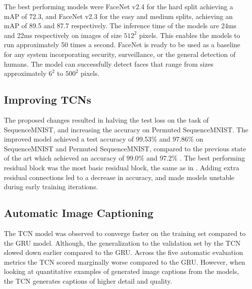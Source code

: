 \documentclass[a4paper, twoside]{article}
\begin{document}
The best performing models were FaceNet v2.4 for the hard split achieving a mAP of 72.3, and FaceNet v2.3 for the easy and medium splits, achieving an mAP of 89.5 and 87.7 respectively. The inference time of the models are 24ms and 22ms respectively on images of size $512^2$ pixels. This enables the models to run approximately 50 times a second. FaceNet is ready to be used as a baseline for any system incorporating security, surveillance, or the general detection of humans. The model can successfully detect faces that range from sizes approximately $6^2$ to $500^2$ pixels.

\subsection*{Improving TCNs}
The proposed changes resulted in halving the test loss on the task of SequenceMNIST, and increasing the accuracy on Permuted SequenceMNIST. The improved model achieved a test accuracy of 99.53\% and 97.86\% on SequenceMNIST and Permuted SequenceMNIST, compared to the previous state of the art which achieved an accuracy of 99.0\% \cite{dilatedgru} and 97.2\% \cite{tcn}. The best performing residual block was the most basic residual block, the same as in \cite{tcn}. Adding extra residual connections led to a decrease in accuracy, and made models unstable during early training iterations.

\subsection*{Automatic Image Captioning}
The TCN model was observed to converge faster on the training set compared to the GRU model. Although, the generalization to the validation set by the TCN slowed down earlier compared to the GRU. Across the five automatic evaluation metrics the TCN scored marginally worse compared to the GRU. However, when looking at quantitative examples of generated image captions from the models, the TCN generates captions of higher detail and quality. 
\end{document}
